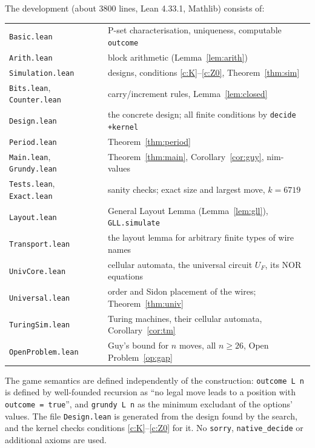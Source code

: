 \documentclass[11pt]{article}
\theoremstyle{definition}
\begin{document}
The development (about $3800$ lines, Lean 4.33.1, Mathlib) consists of:
\begin{center}\small
\begin{tabular}{ll}
\toprule
\texttt{Basic.lean} & P-set characterisation, uniqueness, computable \texttt{outcome}\\
\texttt{Arith.lean} & block arithmetic (Lemma~\ref{lem:arith})\\
\texttt{Simulation.lean} & designs, conditions \ref{c:K}--\ref{c:Z0}, Theorem~\ref{thm:sim}\\
\texttt{Bits.lean}, \texttt{Counter.lean} & carry/increment rules, Lemma~\ref{lem:closed}\\
\texttt{Design.lean} & the concrete design; all finite conditions by \texttt{decide +kernel}\\
\texttt{Period.lean} & Theorem~\ref{thm:period}\\
\texttt{Main.lean}, \texttt{Grundy.lean} & Theorem~\ref{thm:main}, Corollary~\ref{cor:guy}, nim-values\\
\texttt{Tests.lean}, \texttt{Exact.lean} & sanity checks; exact size and largest move, $k=6719$\\
\texttt{Layout.lean} & General Layout Lemma (Lemma~\ref{lem:gll}), \texttt{GLL.simulate}\\
\texttt{Transport.lean} & the layout lemma for arbitrary finite types of wire names\\
\texttt{UnivCore.lean} & cellular automata, the universal circuit $U_F$, its NOR equations\\
\texttt{Universal.lean} & order and Sidon placement of the wires; Theorem~\ref{thm:univ}\\
\texttt{TuringSim.lean} & Turing machines, their cellular automata, Corollary~\ref{cor:tm}\\
\texttt{OpenProblem.lean} & Guy's bound for $n$ moves, all $n\ge26$, Open Problem~\ref{op:gap}\\
\bottomrule
\end{tabular}
\end{center}
The game semantics are defined independently of the construction: \texttt{outcome L n} is defined by
well-founded recursion as ``no legal move leads to a position with \texttt{outcome = true}'', and
\texttt{grundy L n} as the minimum excludant of the options' values.  The file \texttt{Design.lean} is
generated from the design found by the search, and the kernel checks conditions
\ref{c:K}--\ref{c:Z0} for it.  No \texttt{sorry}, \texttt{native\_decide} or additional axioms are used.
\end{document}
